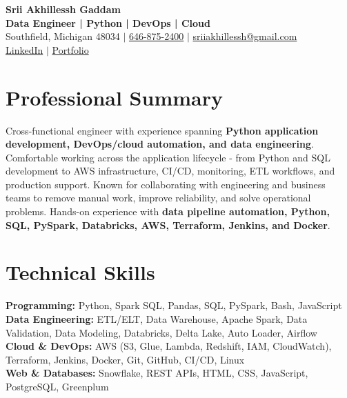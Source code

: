 \documentclass[letterpaper,10pt]{article}
\begin{document}
\fontsize{9.35pt}{10.45pt}\selectfont

\begin{center}
    {\LARGE \textbf{Srii Akhillessh Gaddam}} \\[-1pt]
    \textbf{Data Engineer | Python | DevOps | Cloud} \\[2pt]
    Southfield, Michigan 48034 $|$
    \href{tel:6468752400}{646-875-2400} $|$
    \href{mailto:sriiakhillessh@gmail.com}{sriiakhillessh@gmail.com} \\[1pt]
    \href{https://www.linkedin.com/in/srii-akhiilessh-gaddam-b48668191/}{LinkedIn} $|$
    \href{https://sriiakhillesshg.github.io/portfolio/}{Portfolio}
\end{center}
\vspace{-8pt}

\section{Professional Summary}
\small{Cross-functional engineer with experience spanning \textbf{Python application development, DevOps/cloud automation, and data engineering}. Comfortable working across the application lifecycle - from Python and SQL development to AWS infrastructure, CI/CD, monitoring, ETL workflows, and production support. Known for collaborating with engineering and business teams to remove manual work, improve reliability, and solve operational problems. Hands-on experience with \textbf{data pipeline automation, Python, SQL, PySpark, Databricks, AWS, Terraform, Jenkins, and Docker}.}

\section{Technical Skills}
\small{
\textbf{Programming:} Python, Spark SQL, Pandas, SQL, PySpark, Bash, JavaScript \\
\textbf{Data Engineering:} ETL/ELT, Data Warehouse, Apache Spark, Data Validation, Data Modeling, Databricks, Delta Lake, Auto Loader, Airflow \\
\textbf{Cloud \& DevOps:} AWS (S3, Glue, Lambda, Redshift, IAM, CloudWatch), Terraform, Jenkins, Docker, Git, GitHub, CI/CD, Linux \\
\textbf{Web \& Databases:} Snowflake, REST APIs, HTML, CSS, JavaScript, PostgreSQL, Greenplum
}
\end{document}
